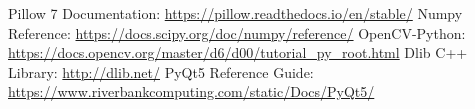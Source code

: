 \newpage
\begin{thebibliography}{9}
    Pillow 7 Documentation: \url{https://pillow.readthedocs.io/en/stable/}
    Numpy Reference: \url{https://docs.scipy.org/doc/numpy/reference/}
    OpenCV-Python: \url{https://docs.opencv.org/master/d6/d00/tutorial_py_root.html}
    Dlib C++ Library: \url{http://dlib.net/}
    PyQt5 Reference Guide: \url{https://www.riverbankcomputing.com/static/Docs/PyQt5/}

\end{thebibliography}